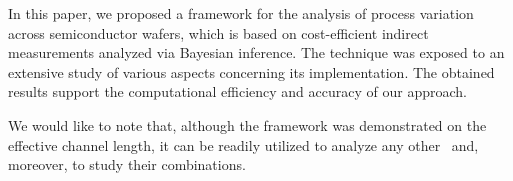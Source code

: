 In this paper, we proposed a framework for the analysis of process variation across semiconductor wafers, which is based on cost-efficient indirect measurements analyzed via Bayesian inference.
The technique was exposed to an extensive study of various aspects concerning its implementation.
The obtained results support the computational efficiency and accuracy of our approach.

We would like to note that, although the framework was demonstrated on the effective channel length, it can be readily utilized to analyze any other \qois\ and, moreover, to study their combinations.
